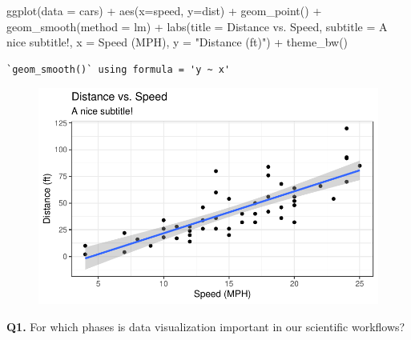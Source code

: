 \documentclass[
  letterpaper,
  DIV=11,
  numbers=noendperiod]{scrartcl}
\newenvironment{Shaded}{\begin{snugshade}}{\end{snugshade}}
\newcommand{\AttributeTok}[1]{\textcolor[rgb]{0.40,0.45,0.13}{#1}}
\newcommand{\FunctionTok}[1]{\textcolor[rgb]{0.28,0.35,0.67}{#1}}
\newcommand{\NormalTok}[1]{\textcolor[rgb]{0.00,0.23,0.31}{#1}}
\newcommand{\SpecialCharTok}[1]{\textcolor[rgb]{0.37,0.37,0.37}{#1}}
\newcommand{\StringTok}[1]{\textcolor[rgb]{0.13,0.47,0.30}{#1}}
\begin{document}
\begin{Shaded}
\begin{Highlighting}[]
 \FunctionTok{ggplot}\NormalTok{(}\AttributeTok{data =}\NormalTok{ cars) }\SpecialCharTok{+} \FunctionTok{aes}\NormalTok{(}\AttributeTok{x=}\NormalTok{speed, }\AttributeTok{y=}\NormalTok{dist) }\SpecialCharTok{+} \FunctionTok{geom\_point}\NormalTok{() }\SpecialCharTok{+}       \FunctionTok{geom\_smooth}\NormalTok{(}\AttributeTok{method =} \StringTok{\textquotesingle{}lm\textquotesingle{}}\NormalTok{) }\SpecialCharTok{+} \FunctionTok{labs}\NormalTok{(}\AttributeTok{title =} \StringTok{\textquotesingle{}Distance vs. Speed\textquotesingle{}}\NormalTok{, }\AttributeTok{subtitle =} \StringTok{\textquotesingle{}A nice subtitle!\textquotesingle{}}\NormalTok{, }\AttributeTok{x =} \StringTok{\textquotesingle{}Speed (MPH)\textquotesingle{}}\NormalTok{, }\AttributeTok{y =} \StringTok{"Distance (ft)"}\NormalTok{) }\SpecialCharTok{+} \FunctionTok{theme\_bw}\NormalTok{()}
\end{Highlighting}
\end{Shaded}

\begin{verbatim}
`geom_smooth()` using formula = 'y ~ x'
\end{verbatim}

\begin{figure}[H]

{\centering \includegraphics{class05_files/figure-pdf/unnamed-chunk-4-4.pdf}

}

\end{figure}

\textbf{Q1.} For which phases is data visualization important in our
scientific workflows?
\end{document}
